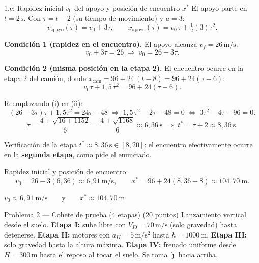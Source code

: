 \documentclass[letterpaper, 11pt]{article}
\begin{document}
\begin{paso}{1.c: Rapidez inicial $v_0$ del apoyo y posici\'on de encuentro $x^{*}$}
El apoyo parte en $t=2\,\mathrm{s}$. Con $\tau=t-2$ (su tiempo de movimiento) y $a=3$:
\[
v_{\text{apoyo}}(\tau)=v_0+3\tau,\qquad
x_{\text{apoyo}}(\tau)=v_0\,\tau+\tfrac12(3)\tau^2 .
\]

\textbf{Condici\'on 1 (rapidez en el encuentro).} El apoyo alcanza $v_f=26\,\mathrm{m/s}$:
\[
v_0+3\tau=26 \;\Rightarrow\; v_0=26-3\tau. \tag{i}
\]

\textbf{Condici\'on 2 (misma posici\'on en la etapa 2).} El encuentro ocurre en la
etapa 2 del cami\'on, donde $x_{\text{cam}}=96+24\,(t-8)=96+24(\tau-6)$:
\[
v_0\tau+1{,}5\,\tau^2 = 96+24(\tau-6). \tag{ii}
\]

Reemplazando (i) en (ii):
\[
(26-3\tau)\tau+1{,}5\tau^2 = 24\tau-48
\;\Longrightarrow\; 1{,}5\,\tau^2-2\tau-48=0
\;\Longleftrightarrow\; 3\tau^2-4\tau-96=0.
\]
\[
\tau=\frac{4+\sqrt{16+1152}}{6}=\frac{4+\sqrt{1168}}{6}\approx 6{,}36\ \mathrm{s}
\;\Rightarrow\; t^{*}=\tau+2\approx 8{,}36\ \mathrm{s}.
\]
\begin{justif}{Verificaci\'on de la etapa}
$t^{*}\approx 8{,}36\,\mathrm{s}\in[8,20]$: el encuentro efectivamente ocurre en la
\textbf{segunda etapa}, como pide el enunciado.
\end{justif}

Rapidez inicial y posici\'on de encuentro:
\[
v_0=26-3(6{,}36)\approx 6{,}91\ \mathrm{m/s},\qquad
x^{*}=96+24(8{,}36-8)\approx 104{,}70\ \mathrm{m}.
\]
\begin{resultado}\centering
$\displaystyle v_0 \approx 6{,}91\ \mathrm{m/s}\qquad\text{y}\qquad x^{*}\approx 104{,}70\ \mathrm{m}$
\end{resultado}
\end{paso}

\newpage
\begin{enunciadobox}{Problema 2 --- Cohete de prueba (4 etapas) \hfill (20 puntos)}
Lanzamiento vertical desde el suelo. \textbf{Etapa I:} sube libre con
$V_{I0}=70\,\mathrm{m/s}$ (solo gravedad) hasta detenerse. \textbf{Etapa II:}
motores con $a_{II}=5\,\mathrm{m/s^2}$ hasta $h=1000\,\mathrm{m}$. \textbf{Etapa III:}
solo gravedad hasta la altura m\'axima. \textbf{Etapa IV:} frenado uniforme desde
$H=300\,\mathrm{m}$ hasta el reposo al tocar el suelo. Se toma $\hat{\jmath}$ hacia arriba.
\end{enunciadobox}
\end{document}
